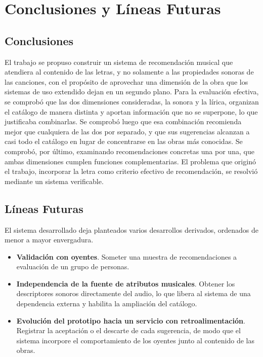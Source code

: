 \chapter{Conclusiones y Líneas Futuras}
\label{ch:conclusiones}

\section{Conclusiones}
\label{sec:conclusiones}

El trabajo se propuso construir un sistema de recomendación musical que atendiera al contenido de las letras, y no solamente a las propiedades sonoras de las canciones, con el propósito de aprovechar una dimensión de la obra que los sistemas de uso extendido dejan en un segundo plano. Para la evaluación efectiva, se comprobó que las dos dimensiones consideradas, la sonora y la lírica, organizan el catálogo de manera distinta y aportan información que no se superpone, lo que justificaba combinarlas. Se comprobó luego que esa combinación recomienda mejor que cualquiera de las dos por separado, y que sus sugerencias alcanzan a casi todo el catálogo en lugar de concentrarse en las obras más conocidas. Se comprobó, por último, examinando recomendaciones concretas una por una, que ambas dimensiones cumplen funciones complementarias. El problema que originó el trabajo, incorporar la letra como criterio efectivo de recomendación, se resolvió mediante un sistema verificable.

\section{Líneas Futuras}
\label{sec:futuras-lineas}

El sistema desarrollado deja planteados varios desarrollos derivados, ordenados de menor a mayor envergadura.

\begin{itemize}[leftmargin=2em]
    \item \textbf{Validación con oyentes}. Someter una muestra de recomendaciones a evaluación de un grupo de personas.

    \item \textbf{Independencia de la fuente de atributos musicales}. Obtener los descriptores sonoros directamente del audio, lo que libera al sistema de una dependencia externa y habilita la ampliación del catálogo.

    \item \textbf{Evolución del prototipo hacia un servicio con retroalimentación}. Registrar la aceptación o el descarte de cada sugerencia, de modo que el sistema incorpore el comportamiento de los oyentes junto al contenido de las obras.
\end{itemize}
